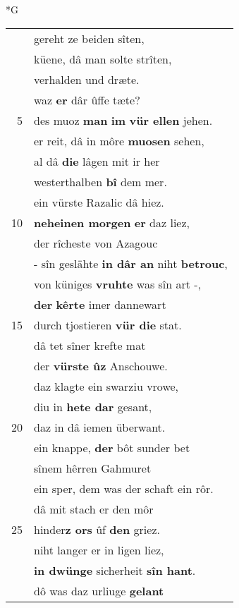 \documentclass[8pt,a4paper,notitlepage]{article}
\begin{document}
\newpage
\begin{table}[ht]
\begin{minipage}[t]{0.5\linewidth}
\small
\begin{center}*G
\end{center}
\begin{tabular}{rl}
 & gereht ze beiden sîten,\\ 
 & küene, dâ man solte strîten,\\ 
 & verhalden und dræte.\\ 
 & waz \textbf{er} dâr ûffe tæte?\\ 
5 & des muoz \textbf{man} \textbf{im} \textbf{vür ellen} jehen.\\ 
 & er reit, dâ in môre \textbf{muosen} sehen,\\ 
 & al dâ \textbf{die} lâgen mit ir her\\ 
 & westerthalben \textbf{bî} dem mer.\\ 
 & ein vürste Razalic dâ hiez.\\ 
10 & \textbf{neheinen morgen} \textbf{er} daz liez,\\ 
 & der rîcheste von Azagouc\\ 
 & - sîn geslähte \textbf{in dâr an} niht \textbf{betrouc},\\ 
 & von küniges \textbf{vruhte} was sîn art -,\\ 
 & \textbf{der} \textbf{kêrte} imer dannewart\\ 
15 & durch tjostieren \textbf{vür die} stat.\\ 
 & dâ tet sîner krefte mat\\ 
 & der \textbf{vürste ûz} Anschouwe.\\ 
 & daz klagte ein swarziu vrowe,\\ 
 & diu in \textbf{hete dar} gesant,\\ 
20 & daz in dâ iemen überwant.\\ 
 & ein knappe, \textbf{der} bôt sunder bet\\ 
 & sînem hêrren Gahmuret\\ 
 & ein sper, dem was der schaft ein rôr.\\ 
 & dâ mit stach er den môr\\ 
25 & hinder\textbf{z ors} ûf \textbf{den} griez.\\ 
 & niht langer er in ligen liez,\\ 
 & \textbf{in dwünge} sicherheit \textbf{sîn hant}.\\ 
 & dô was daz urliuge \textbf{gelant}\\ 

\end{tabular}
\end{minipage}
\end{table}
\end{document}
